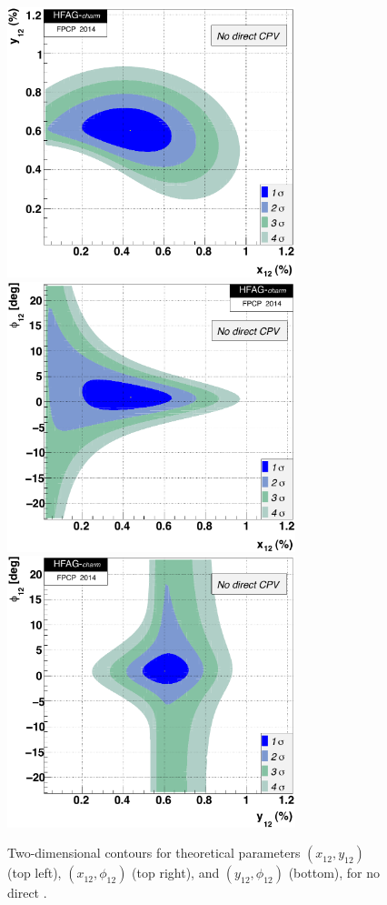 \begin{figure}
\begin{center}
\vbox{
\includegraphics[width=84mm]{figures/charm/fig_plot_xy122d}
\includegraphics[width=84mm]{figures/charm/fig_plot_xp122d}
\vskip0.30in
\includegraphics[width=84mm]{figures/charm/fig_plot_yp122d}
}
\end{center}
\vskip-0.10in
\caption{\label{fig:contours_ndcpv}
Two-dimensional contours for theoretical parameters 
$(x^{}_{12},y^{}_{12})$ (top left), 
$(x^{}_{12},\phi^{}_{12})$ (top right), and 
$(y^{}_{12},\phi^{}_{12})$ (bottom), 
for no direct \cpv.}
\end{figure}


